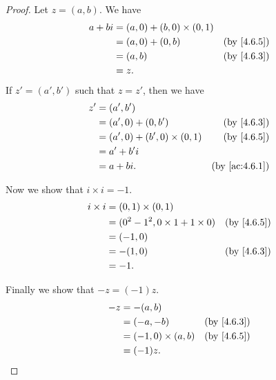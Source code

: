 \begin{proof}
  Let \(z = (a, b)\).
  We have
  \begin{align*}
    a + bi & = (a, 0) + (b, 0) \times (0, 1)                            \\
           & = (a, 0) + (0, b)               & \text{(by \cref{4.6.5})} \\
           & = (a, b)                        & \text{(by \cref{4.6.3})} \\
           & = z.
  \end{align*}
  If \(z' = (a', b')\) such that \(z = z'\), then we have
  \begin{align*}
    z' & = (a', b')                                                      \\
       & = (a', 0) + (0, b')               & \text{(by \cref{4.6.3})}    \\
       & = (a', 0) + (b', 0) \times (0, 1) & \text{(by \cref{4.6.5})}    \\
       & = a' + b' i                                                     \\
       & = a + bi.                         & \text{(by \cref{ac:4.6.1})}
  \end{align*}

  Now we show that \(i \times i = -1\).
  \begin{align*}
    i \times i & = (0, 1) \times (0, 1)                                            \\
               & = (0^2 - 1^2, 0 \times 1 + 1 \times 0) & \text{(by \cref{4.6.5})} \\
               & = (-1, 0)                                                         \\
               & = -(1, 0)                              & \text{(by \cref{4.6.3})} \\
               & = -1.
  \end{align*}

  Finally we show that \(-z = (-1) z\).
  \begin{align*}
    -z & = -(a, b)                                          \\
       & = (-a, -b)              & \text{(by \cref{4.6.3})} \\
       & = (-1, 0) \times (a, b) & \text{(by \cref{4.6.5})} \\
       & = (-1) z.
  \end{align*}
\end{proof}

